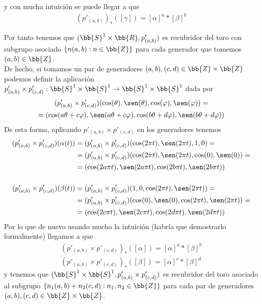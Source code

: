 \begin{ejemplo}
\begin{enumerate}
        y con mucha intuición se puede llegar a que 
        \begin{gather*}
            (p'_{(a,b)})_*([\gamma]) = [\alpha]^a \ast [\beta]^b
        \end{gather*}

        Por tanto tenemos que $(\bb{S}^1 \times \bb{R}, p'_{(a,b)})$ es recubridor del toro con subgrupo asociado $\{n(a,b) : n\in \bb{Z}\}$ para cada generador que tomemos $(a,b)\in \bb{Z}$.\\

        De hecho, si tomamos un par de generadores $(a,b), (c,d)\in \bb{Z}\times \bb{Z}$ podemos definir la aplicación $p'_{(a,b)}\times p'_{(c,d)}: \bb{S}^1 \times \bb{S}^1 \to \bb{S}^1 \times \bb{S}^1$ dada por 
        \begin{gather*}
            (p'_{(a,b)}\times p'_{(c,d)})(\cos(\theta), \sen(\theta), \cos(\varphi), \sen(\varphi)) =\\
            = (\cos(a\theta + c\varphi), \sen(a\theta + c\varphi), \cos(b\theta + d\varphi), \sen(b\theta + d\varphi))
        \end{gather*}
        De esta forma, aplicando $p'_{(a,b)}\times p'_{(c,d)}$ en los generadores tenemos
        \begin{align*}
            (p'_{(a,b)}\times p'_{(c,d)})(\alpha(t)) &= (p'_{(a,b)}\times p'_{(c,d)})(\cos(2\pi t), \sen(2\pi t), 1, 0) =\\
            &= (p'_{(a,b)}\times p'_{(c,d)})(\cos(2\pi t), \sen(2\pi t), \cos(0), \sen(0)) =\\
            &= (\cos(2a\pi t), \sen(2a\pi t), \cos(2b\pi t), \sen(2b\pi t))\\\\
            (p'_{(a,b)}\times p'_{(c,d)})(\beta(t)) &= (p'_{(a,b)}\times p'_{(c,d)})(1, 0, \cos(2\pi t), \sen(2\pi t)) =\\
            &= (p'_{(a,b)}\times p'_{(c,d)})(\cos(0), \sen(0), \cos(2\pi t), \sen(2\pi t)) =\\
            &= (\cos(2c\pi t), \sen(2c\pi t), \cos(2d\pi t), \sen(2d\pi t))
        \end{align*}
        Por lo que de nuevo usando mucho la intuición (habría que demostrarlo formalmente) llegamos a que
        \begin{gather*}
            (p'_{(a,b)}\times p'_{(c,d)})_*([\alpha]) = [\alpha]^a \ast [\beta]^b\\
            (p'_{(a,b)}\times p'_{(c,d)})_*([\beta]) = [\alpha]^c \ast [\beta]^d
        \end{gather*}
        y tenemos que $(\bb{S}^1 \times \bb{S}^1, p'_{(a,b)}\times p'_{(c,d)})$ es recubridor del toro asociado al subgrupo $\{n_1(a,b) + n_2(c,d) : n_1,n_2\in \bb{Z}\}$ para cada par de generadores $(a,b),(c,d)\in \bb{Z}\times \bb{Z}$.\\


\end{enumerate}
\end{ejemplo}
